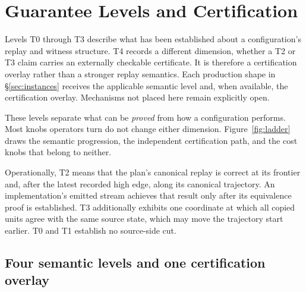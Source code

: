 \documentclass[sigconf,nonacm,10pt]{acmart}
\theoremstyle{plain}
\theoremstyle{definition}
\begin{document}
\section{Guarantee Levels and Certification}\label{sec:tiers}

Levels T0 through T3 describe what has been established about a
configuration's replay and witness structure. T4 records a different
dimension, whether a T2 or T3 claim carries an externally checkable
certificate. It is therefore a certification overlay rather than a
stronger replay semantics. Each production shape in
\S\ref{sec:instances} receives the applicable semantic level and, when
available, the certification overlay. Mechanisms not placed here remain
explicitly open.

These levels separate what can be \emph{proved} from how a configuration
performs. Most knobs operators turn do not change either dimension.
Figure~\ref{fig:ladder} draws the semantic progression, the independent
certification path, and the cost knobs that belong to neither.

Operationally, T2 means that the plan's canonical replay is correct at
its frontier and, after the latest recorded high edge, along its
canonical trajectory. An implementation's emitted stream
achieves that result only after its equivalence proof is established.
T3 additionally exhibits one coordinate at which all copied units
agree with the same source state, which may move the trajectory start
earlier. T0 and T1 establish no source-side cut.

\subsection{Four semantic levels and one certification overlay}\label{sec:tiers-rungs}
\end{document}
